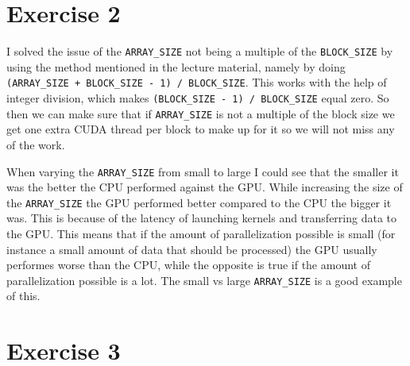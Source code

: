 \documentclass[a4paper, 12pt]{article}
\def\code#1{\texttt{#1}}
\begin{document}
\section{Exercise 2}
I solved the issue of the \code{ARRAY\_SIZE} not being a multiple of the \code{BLOCK\_SIZE} by using the method mentioned in the lecture material, namely by doing \code{(ARRAY\_SIZE + BLOCK\_SIZE - 1) / BLOCK\_SIZE}. This works with the help of integer division, which makes \code{(BLOCK\_SIZE - 1) / BLOCK\_SIZE} equal zero. So then we can make sure that if \code{ARRAY\_SIZE} is not a multiple of the block size we get one extra CUDA thread per block to make up for it so we will not miss any of the work.
\par When varying the \code{ARRAY\_SIZE} from small to large I could see that the smaller it was the better the CPU performed against the GPU. While increasing the size of the \code{ARRAY\_SIZE} the GPU performed better compared to the CPU the bigger it was. This is because of the latency of launching kernels and transferring data to the GPU. This means that if the amount of parallelization possible is small (for instance a small amount of data that should be processed) the GPU usually performes worse than the CPU, while the opposite is true if the amount of parallelization possible is a lot. The small vs large \code{ARRAY\_SIZE} is a good example of this.




\section{Exercise 3}


\end{document}
